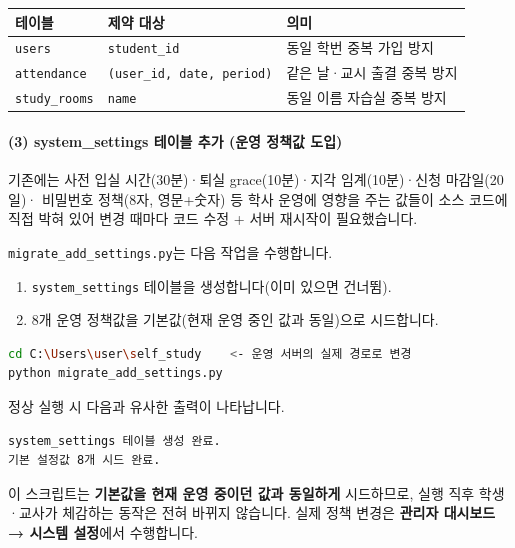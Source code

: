 \documentclass[a4paper,12pt]{article}
\newcommand{\menu}[1]{\textcolor{primary}{\textbf{#1}}}
\begin{document}
\begin{center}
\begin{tabularx}{\textwidth}{llX}
\toprule
\textbf{테이블} & \textbf{제약 대상} & \textbf{의미} \\
\midrule
\texttt{users} & \texttt{student\_id} & 동일 학번 중복 가입 방지 \\
\texttt{attendance} & \texttt{(user\_id, date, period)} & 같은 날·교시 출결 중복 방지 \\
\texttt{study\_rooms} & \texttt{name} & 동일 이름 자습실 중복 방지 \\
\bottomrule
\end{tabularx}
\end{center}

\paragraph{(3) system\_settings 테이블 추가 (운영 정책값 도입)}

기존에는 사전 입실 시간(30분)·퇴실 grace(10분)·지각 임계(10분)·신청 마감일(20일)·
비밀번호 정책(8자, 영문+숫자) 등 학사 운영에 영향을 주는 값들이
소스 코드에 직접 박혀 있어 변경 때마다 코드 수정 + 서버 재시작이 필요했습니다.

\texttt{migrate\_add\_settings.py}는 다음 작업을 수행합니다.

\begin{enumerate}[leftmargin=1.5em]
    \item \texttt{system\_settings} 테이블을 생성합니다(이미 있으면 건너뜀).
    \item 8개 운영 정책값을 기본값(현재 운영 중인 값과 동일)으로 시드합니다.
\end{enumerate}

\begin{lstlisting}[language=bash, caption=시스템 설정 마이그레이션 실행]
cd C:\Users\user\self_study    <- 운영 서버의 실제 경로로 변경
python migrate_add_settings.py
\end{lstlisting}

정상 실행 시 다음과 유사한 출력이 나타납니다.

\begin{lstlisting}
system_settings 테이블 생성 완료.
기본 설정값 8개 시드 완료.
\end{lstlisting}

\begin{notebox}
  이 스크립트는 \textbf{기본값을 현재 운영 중이던 값과 동일하게} 시드하므로,
  실행 직후 학생·교사가 체감하는 동작은 전혀 바뀌지 않습니다.
  실제 정책 변경은 \menu{관리자 대시보드 → 시스템 설정}에서 수행합니다.
\end{notebox}
\end{document}
